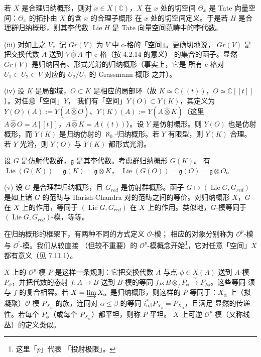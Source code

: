 若 $X$ 是合理归纳概形，则对 $x\in X(\mathbb{C})$，$X$ 在 $x$ 处的切空间
$\Theta_x$ 是 Tate 向量空间：$\Theta_x$ 的拓扑由 $X$ 的含 $x$ 的合理子概形
在 $x$ 处的切空间定义。于是若 $H$ 是合理群归纳概形，则其李代数
$\operatorname{Lie}H$ 是 Tate 向量空间范畴中的李代数。

(iii) 对如上之 $V$，记 $Gr(V)$ 为 $V$ 中 c-格的「空间」。更确切地说，
$Gr(V)$ 是把交换代数 $A$ 送到 $V\hat\otimes A$ 中 c-格（按 4.2.14 的意义）
的集合的函子。显然 $Gr(V)$ 是归纳固有、形式光滑的归纳概形（事实上，它是
所有 c-格对 $U_1\subset U_2\subset V$ 对应的 $U_2/U_1$ 的 Grassmann 概形
之并）。


(iv) 设 $K$ 是局部域，$O\subset K$ 是相应的局部环（故
$K\simeq\mathbb{C}((t))$，$O\simeq\mathbb{C}[[t]]$）。对任意「空间」$Y$，
我们有「空间」$Y(O)\subset Y(K)$，其定义为 $Y(O)(A):=
Y(A\hat\otimes O)$、$Y(K)(A):=Y(A\hat\otimes K)$（这里
$A\hat\otimes O=A[[t]]$，$A\hat\otimes K=A((t))$）。设 $Y$ 是仿射概形。则
$Y(O)$ 也是仿射概形，而 $Y(K)$ 是归纳仿射的 $\aleph_0$-归纳概形。若 $Y$
有限型，则 $Y(K)$ 合理。若 $Y$ 光滑，则 $Y(O)$ 与 $Y(K)$ 都形式光滑。

设 $G$ 是仿射代数群，$\mathfrak{g}$ 是其李代数。考虑群归纳概形 $G(K)$。
有 $\operatorname{Lie}(G(K))=\mathfrak{g}(K)=\mathfrak{g}\otimes K$，
$\operatorname{Lie}(G(O))=\mathfrak{g}(O)=\mathfrak{g}\otimes O$。

(v) 设 $G$ 是合理群归纳概形，且 $G_{red}$ 是仿射群概形。函子
$G\mapsto(\operatorname{Lie}G,G_{red})$ 是如上诸 $G$ 的范畴与 Harish-Chandra
对的范畴之间的等价。对归纳概形 $X$，$G$ 在 $X$ 上的作用，等同于
$(\operatorname{Lie}G,G_{red})$ 在 $X$ 上的作用。类似地，$G$-模等同于
$(\operatorname{Lie}G,G_{red})$-模，等等。

 在归纳概形的框架下，有两种不同的方式定义 $\mathcal{O}$-模；
相应的对象分别称为 $\mathcal{O}^{p}$-模与 $\mathcal{O}^{!}$-模。我们从较直接
（但较不重要）的 $\mathcal{O}^{p}$-模概念开始\footnote{这里「$p$」代表
「投射极限」。}，它对任意「空间」$X$ 都有意义（见 7.11.1）。

$X$ 上的 $\mathcal{O}^{p}$-模 $P$ 是这样一条规则：它把交换代数 $A$ 与点
$\phi\in X(A)$ 送到 $A$-模 $P_\phi$，并把代数的态射 $f:A\to B$ 送到
$B$-模的等同 $f_P:B\otimes_f P_\phi\xrightarrow{\ \sim\ }P_{f\phi}$。这些等同
须与 $f$ 的复合相容。若 $X=\varinjlim X_\alpha$ 是归纳概形，则这样的 $P$
等同于：$X_\alpha$ 上（拟凝聚）$\mathcal{O}$-模 $P_{X_\alpha}$ 的族，连同对
$\alpha\le\beta$ 的等同 $i^*_{\alpha\beta}P_{X_\beta}=P_{X_\alpha}$，且满足
显然的传递性。若每个 $P_\phi$（或每个 $P_{X_\alpha}$）都平坦，则称 $P$ 平坦。
$X$ 上可逆 $\mathcal{O}^{p}$-模（又称线丛）的定义类似。

